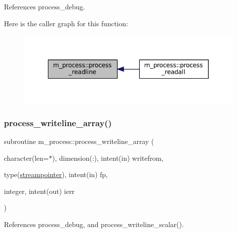 References process\+\_\+debug.

Here is the caller graph for this function\+:
\nopagebreak
\begin{figure}[H]
\begin{center}
\leavevmode
\includegraphics[width=342pt]{namespacem__process_acbc72c5ed371430a471aa1f3010fbbda_icgraph}
\end{center}
\end{figure}
\mbox{\label{namespacem__process_a08887a918eba167ceacddf58ca084270}} 
\subsubsection{\texorpdfstring{process\+\_\+writeline\+\_\+array()}{process\_writeline\_array()}}
{\footnotesize\ttfamily subroutine m\+\_\+process\+::process\+\_\+writeline\+\_\+array (\begin{DoxyParamCaption}\item[{character(len=$\ast$), dimension(\+:), intent(in)}]{writefrom,  }\item[{type(\mbox{\hyperlink{structm__process_1_1streampointer}{streampointer}}), intent(in)}]{fp,  }\item[{integer, intent(out)}]{ierr }\end{DoxyParamCaption})\hspace{0.3cm}{\ttfamily [private]}}



References process\+\_\+debug, and process\+\_\+writeline\+\_\+scalar().


